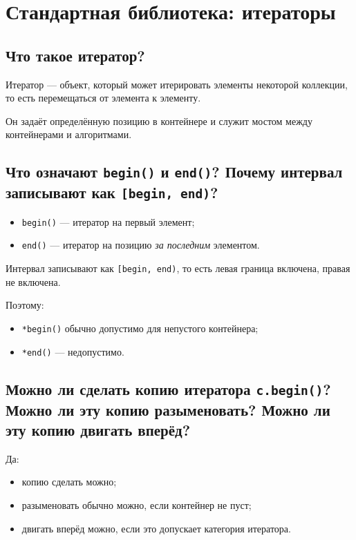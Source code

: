 \section{Стандартная библиотека: итераторы}

\subsection{Что такое итератор?}

Итератор --- объект, который может итерировать элементы некоторой коллекции, то есть перемещаться от элемента к элементу.

Он задаёт определённую позицию в контейнере и служит мостом между контейнерами и алгоритмами.


\subsection{Что означают \texttt{begin()} и \texttt{end()}? Почему интервал записывают как \texttt{[begin, end)}?}

\begin{itemize}
    \item \texttt{begin()} --- итератор на первый элемент;
    \item \texttt{end()} --- итератор на позицию \emph{за последним} элементом.
\end{itemize}

Интервал записывают как \texttt{[begin, end)}, то есть левая граница включена, правая не включена.

Поэтому:
\begin{itemize}
    \item \texttt{*begin()} обычно допустимо для непустого контейнера;
    \item \texttt{*end()} --- недопустимо.
\end{itemize}


\subsection{Можно ли сделать копию итератора \texttt{c.begin()}? Можно ли эту копию разыменовать? Можно ли эту копию двигать вперёд?}

Да:
\begin{itemize}
    \item копию сделать можно;
    \item разыменовать обычно можно, если контейнер не пуст;
    \item двигать вперёд можно, если это допускает категория итератора.
\end{itemize}


